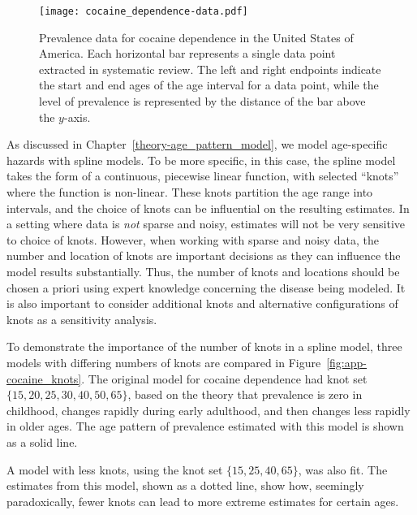     \begin{figure}[h]
        \begin{center}
            \texttt{[image: cocaine\_dependence-data.pdf]}
            \caption{Prevalence data for cocaine dependence in the
              United States of America. Each horizontal bar represents
              a single data point extracted in systematic review.  The
              left and right endpoints indicate the start and end ages
              of the age interval for a data point, while the level of
              prevalence is represented by the distance of the bar
              above the $y$-axis.}
            \label{fig:app-cocaine_data}
        \end{center}
    \end{figure}

As discussed in Chapter~\ref{theory-age_pattern_model}, we model
age-specific hazards with spline models.  To be more specific, in this
case, the spline model takes the form of a continuous, piecewise
linear function, with selected ``knots'' where the function is non-linear.
These knots partition the age range
into intervals, and the choice of knots can be influential on the
resulting estimates.  In a setting where data is \emph{not} sparse and
noisy, estimates will not be very sensitive to choice of knots.
However, when working with sparse and noisy data, the number and
location of knots are important decisions as they can influence the
model results substantially.  Thus, the number of knots and locations
should be chosen a priori using expert knowledge concerning the
disease being modeled.  It is also
important to consider additional knots and alternative configurations
of knots as a sensitivity analysis.

To demonstrate the importance of the number of knots in a spline
model, three models with differing numbers of knots are compared in
Figure~\ref{fig:app-cocaine_knots}.  The original model for cocaine
dependence had knot set $\{15, 20, 25, 30, 40, 50, 65\}$, based on the theory that prevalence is zero in childhood,
changes rapidly during early adulthood, and then changes less rapidly
in older ages.  The age pattern of prevalence estimated with this
model is shown as a solid line.

A model with less knots, using the knot set $\{15, 25, 40, 65\}$,
was also fit.  The estimates from this model, shown as a dotted line,
show how, seemingly paradoxically, fewer knots can lead to more
extreme estimates for certain ages.

